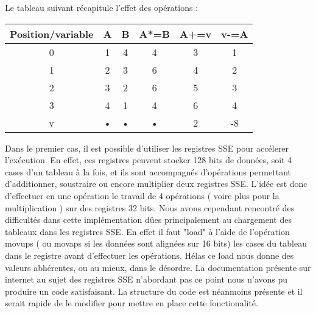 Le tableau suivant récapitule l'effet des opérations : \\
\begin{tabular}[h]{|c|c|c|c|c|c|}
\hline Position/variable & A & B & A*=B & A+=v & v-=A \\ 
\hline 0 & 1 & 4 & 4 & 3 & 1 \\ 
\hline 1 & 2 & 3 & 6 & 4 & 2 \\ 
\hline 2 & 3 & 2 & 6 & 5 & 3 \\ 
\hline 3 & 4 & 1 & 4 & 6 & 4 \\ 
\hline v & • & • & • & 2 & -8 \\ 
\hline 
\end{tabular} 

Dans le premier cas, il est possible d'utiliser les registres SSE pour accélerer l'exécution. En effet, ces registres peuvent stocker 128 bits de données, soit 4 cases d'un tableau à la fois, et ils sont accompagnés d'opérations permettant d'additionner, soustraire ou encore multiplier deux registres SSE. L'idée est donc d'effectuer en une opération le travail de 4 opérations ( voire plus pour la multiplication ) sur des registres 32 bits. Nous avons cependant rencontré des difficultés dans cette implémentation d\^ues principalement au chargement des tableaux dans les registres SSE. En effet il faut "load" à l'aide de l'opération movups ( ou movaps si les données sont alignées sur 16 bits) les cases du tableau dans le registre avant d'effectuer les opérations. Hélas ce load nous donne des valeurs abhérentes, ou au mieux, dans le désordre. La documentation présente sur internet au sujet des registres SSE n'abordant pas ce point nous n'avons pu produire un code satisfaisant. La structure du code est néanmoins présente et il serait rapide de le modifier pour mettre en place cette fonctionalité.	 